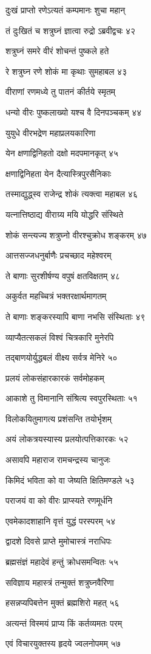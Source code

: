 दुःखं प्राप्तो रणेऽत्यतं कम्पमानः शुचा महान्

तं दुःखितं च शत्रुघ्नं ज्ञात्वा रुद्रो ऽब्रवीद्वचः ४२

शत्रुघ्नं समरे वीरं शोचन्तं पुष्कले हते

रे शत्रुघ्न रणे शोकं मा कृथाः सुमहाबल ४३

वीराणां रणमध्ये तु पातनं कीर्तये स्मृतम्

धन्यो वीरः पुष्कलाख्यो यश्च वै दिनपञ्चकम् ४४

युयुधे वीरभद्रेण महाप्रलयकारिणा

येन क्षणाद्विनिहतो दक्षो मदपमानकृत् ४५

क्षणाद्विनिहता येन दैत्यास्त्रिपुरसैनिकाः

तस्माद्युद्ध्स्व राजेन्द्र शोकं त्यक्त्वा महाबल ४६

यत्नात्तिष्ठाद्य वीराग्र्य मयि योद्धरि संस्थिते

शोकं सन्त्यज्य शत्रुघ्नो वीरश्चुक्रोध शङ्करम् ४७

आत्तसज्जधनुर्बाणैः प्रचच्छाद महेश्वरम्

ते बाणाः सुरशीर्षण्य वपुषं क्षतविक्षतम् ४८

अकुर्वत महच्चित्रं भक्तरक्षार्थमागतम्

ते बाणाः शङ्करस्यापि बाणा नभसि संस्थिताः ४९

व्याप्यैतत्सकलं विश्वं चित्रकारि मुनेरपि

तद्बाणयोर्युद्धबलं वीक्ष्य सर्वत्र मेनिरे ५०

प्रलयं लोकसंहारकारकं सर्वमोहकम्

आकाशे तु विमानानि संश्रित्य स्वपुरस्थिताः ५१

विलोकयितुमागत्य प्रशंसन्ति तयोर्भृशम्

अयं लोकत्रयस्यास्य प्रलयोत्पत्तिकारकः ५२

असावपि महाराज रामचन्द्रस्य चानुजः

किमिदं भविता को वा जेष्यति क्षितिमण्डले ५३

पराजयं वा को वीरः प्राप्स्यते रणमूर्धनि

एवमेकादशाहानि वृत्तं युद्धं परस्परम् ५४

द्वादशे दिवसे प्राप्ते मुमोचास्त्रं नराधिपः

ब्रह्मसंज्ञं महादेवं हन्तुं क्रोधसमन्वितः ५५

सविज्ञाय महास्त्रं तन्मुक्तं शत्रुघ्नवैरिणा

हसन्नप्यपिबत्तेन मुक्तं ब्रह्मशिरो महत् ५६

अत्यन्तं विस्मयं प्राप्य किं कर्तव्यमतः परम्

एवं विचारयुक्तस्य हृदये ज्वलनोपमम् ५७

